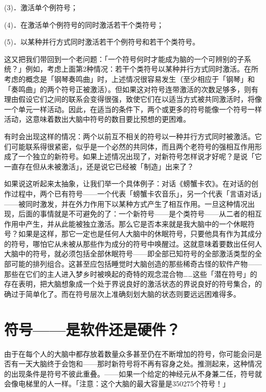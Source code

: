 \documentclass[
  12pt,
  twoside,
  openright,
  oldfontcommands,
]{memoir}
\begin{document}
(3)．激活单个例符号；

(4)．在激活单个例符号的同时激活若干个类符号；

(5)．以某种并行方式同时激活若干个例符号和若干个类符号。

这又把我们带回到一个老问题：「一个符号何时才能成为脑的一个可辨别的子系统？」例如，考虑上面第2种情况：若干个类符号以某种并行方式同时激活。在所考虑的概念是「钢琴奏鸣曲」时，上述情况很容易发生（至少相应于「钢琴」和「奏鸣曲」的两个符号正被激活）。但如果这对符号连带激活的次数足够多，则有理由假设它们之间的联系会变得很强，致使它们在以适当方式被共同激活时，将像一个单元一样活动。因此，在适当的条件下，两个或更多的符号能像一个符号一样活动，这意味着数出大脑中符号的数目要比预想的更困难。

有时会出现这样的情况：两个以前互不相关的符号以一种并行方式同时被激活。它们可能联系得很紧密，似乎是一个必然的共同体，而且两个老符号的强相互作用形成了一个独立的新符号。如果上述情况出现了，对新符号怎样说才好呢？是说「它一直存在但从未被激活」，还是说它已经被「制造」出来了？

如果说这听起来太抽象，让我们举一个具体例子：对话《螃蟹卡农》。在对话的创作过程中，两个已有符号------一个代表「螃蟹卡农音乐」，另一个代表「言语对话」------被同时激发，并在外力作用下以某种方式产生了相互作用。一旦这种情况出现，后面的事情就是不可避免的了：一个新符号------是个类符号------从二者的相互作用中产生，并从此能被独立激活。那么它是否本来就是我大脑中的一个休眠符号？如果是这样，那它一定也是任何人大脑中的休眠符号，只要他具有作为其成分的符号，哪怕它从未被从那些作为成分的符号中唤醒过。这就意味着要数出任何人大脑中的符号，就必须包括全部休眠符号------即全部已知符号的全部激活类型的全部可能的排列组合。这甚至应包括睡觉时大脑创造的那些稀奇古怪的软件产物------那些在它们的主人进入梦乡时被唤起的奇特的观念混合物\ldots\ldots 这些「潜在符号」的存在表明，把大脑想象成一个处于界说良好的激活状态的界说良好的符号集合，的确过于简单化了。而在符号层次上准确刻划大脑的状态则要远远困难得多。

\section{符号------是软件还是硬件？}

由于在每个人的大脑中都存放着数量众多甚至仍在不断增加的符号，你可能会问是否有一天大脑终于会饱和------那时新符号将不再有容身之处。推测起来，这种情况的出现条件是符号不彼此重叠。------如果一个给定的神经元从不身兼二任，符号就会像电梯里的人一样。「注意：这个大脑的最大容量是350275个符号！」
\end{document}
